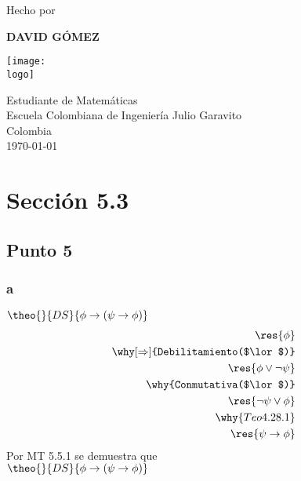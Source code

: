 \documentclass[twoside]{article}
\newcommand{\logo}{C:/Users/usuario/Documents/U/logo-eci.jpg}
\newcommand{\titlename}{Tarea 10}
\renewcommand{\author}{David Gómez}
\begin{document}
\begin{titlepage}
    \begin{center}
        \vspace*{1cm}
 
        \textbf{\fontsize{45}{\baselineskip}\selectfont{\titlename}}

        \vspace{4cm}

        {\Large Hecho por}

        \vspace{1cm}

        {\textbf{\LARGE\MakeUppercase{\author}}}

        \vspace{2cm}

        \texttt{[image: \\logo]}

        \vspace{2cm}

        {\Large Estudiante de Matemáticas\\[5pt]

        Escuela Colombiana de Ingeniería Julio Garavito\\[5pt]

        Colombia\\[5pt]

        \today}
             
    \end{center}
\end{titlepage}

\tableofcontents
\clearpage

\section{Sección 5.3}

\subsection{Punto 5}
\subsubsection{a}
\begin{logicenv}{$\theo{}{DS}{\phi \to (\psi \to \phi)}$}
    \begin{align*}
            \res{\phi}\\
        \why[\Rightarrow]{Debilitamiento($\lor$)}\\
            \res{\phi \lor \neg \psi}\\
        \why{Conmutativa($\lor$)}\\
            \res{\neg \psi \lor \phi}\\
        \why{Teo 4.28.1}\\
            \res{\psi \to \phi}
    \end{align*}
    Por MT 5.5.1 se demuestra que\\
    $\theo{}{DS}{\phi \to (\psi \to \phi)}$
\end{logicenv}
\end{document}
